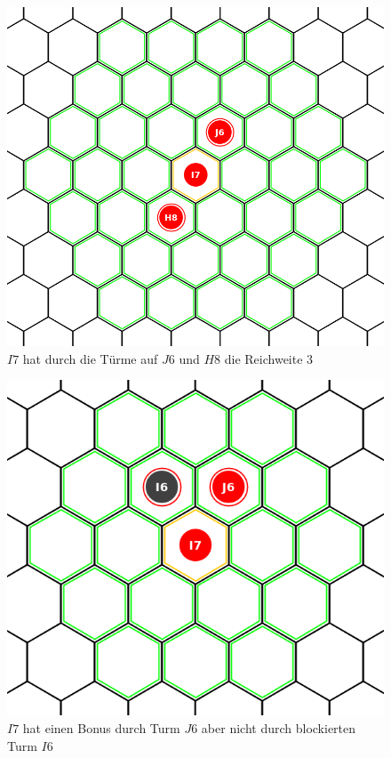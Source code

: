 \begin{figure}[ht]
\begin{center}
\includegraphics[scale=0.25]{graphic/move-rangeddouble.png}
\end{center}
\caption*{$I7$ hat durch die Türme auf $J6$ und $H8$ die Reichweite $3$}
\end{figure}

\begin{figure}[ht]
\begin{center}
\includegraphics[scale=0.25]{graphic/range-blockedbonus.png}
\end{center}
\caption*{$I7$ hat einen Bonus durch Turm $J6$ aber nicht durch blockierten Turm $I6$}
\end{figure}

